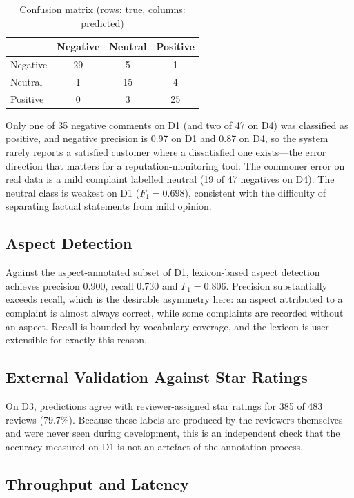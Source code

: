 \documentclass[conference]{IEEEtran}
\begin{document}
\begin{table}[htbp]
\caption{Confusion matrix (rows: true, columns: predicted)}
\label{tab:cm}
\centering
\begin{tabular}{@{}lccc@{}}
\toprule
 & \textbf{Negative} & \textbf{Neutral} & \textbf{Positive} \\
\midrule
Negative & 29 & 5  & 1  \\
Neutral  & 1  & 15 & 4  \\
Positive & 0  & 3  & 25 \\
\bottomrule
\end{tabular}
\end{table}

Only one of 35 negative comments on D1 (and two of 47 on D4) was classified as positive,
and negative precision is 0.97 on D1 and 0.87 on D4, so the system rarely reports a
satisfied customer where a dissatisfied one exists---the error direction that matters for a
reputation-monitoring tool. The commoner error on real data is a mild complaint labelled
neutral (19 of 47 negatives on D4). The neutral class is weakest on D1 ($F_1 = 0.698$),
consistent with the difficulty of separating factual statements from mild opinion.

\subsection{Aspect Detection}

Against the aspect-annotated subset of D1, lexicon-based aspect detection achieves
precision 0.900, recall 0.730 and $F_1 = 0.806$. Precision substantially exceeds recall,
which is the desirable asymmetry here: an aspect attributed to a complaint is almost
always correct, while some complaints are recorded without an aspect. Recall is bounded by
vocabulary coverage, and the lexicon is user-extensible for exactly this reason.

\subsection{External Validation Against Star Ratings}

On D3, predictions agree with reviewer-assigned star ratings for 385 of 483 reviews
(79.7\%). Because these labels are produced by the reviewers themselves and were never
seen during development, this is an independent check that the accuracy measured on D1 is
not an artefact of the annotation process.

\subsection{Throughput and Latency}
\end{document}
